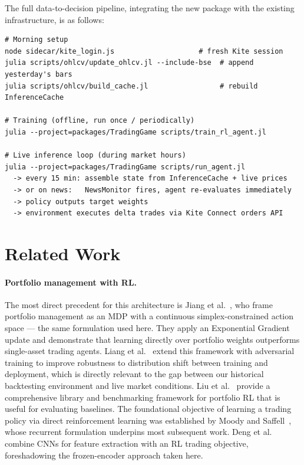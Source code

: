 \documentclass[11pt, a4paper]{article}
\begin{document}
The full data-to-decision pipeline, integrating the new package with the
existing infrastructure, is as follows:

\begin{lstlisting}
# Morning setup
node sidecar/kite_login.js                    # fresh Kite session
julia scripts/ohlcv/update_ohlcv.jl --include-bse  # append yesterday's bars
julia scripts/ohlcv/build_cache.jl                 # rebuild InferenceCache

# Training (offline, run once / periodically)
julia --project=packages/TradingGame scripts/train_rl_agent.jl

# Live inference loop (during market hours)
julia --project=packages/TradingGame scripts/run_agent.jl
  -> every 15 min: assemble state from InferenceCache + live prices
  -> or on news:   NewsMonitor fires, agent re-evaluates immediately
  -> policy outputs target weights
  -> environment executes delta trades via Kite Connect orders API
\end{lstlisting}

\section{Related Work}

\paragraph{Portfolio management with RL.}
The most direct precedent for this architecture is Jiang et al.\
\cite{jiang2017portfolio}, who frame portfolio management as an MDP with a
continuous simplex-constrained action space — the same formulation used here.
They apply an Exponential Gradient update and demonstrate that learning
directly over portfolio weights outperforms single-asset trading agents.
Liang et al.\ \cite{liang2018adversarial} extend this framework with
adversarial training to improve robustness to distribution shift between
training and deployment, which is directly relevant to the gap between our
historical backtesting environment and live market conditions. Liu et al.\
\cite{liu2021finrl} provide a comprehensive library and benchmarking
framework for portfolio RL that is useful for evaluating baselines.
The foundational objective of learning a trading policy via direct
reinforcement learning was established by Moody and Saffell~\cite{moody2001trading},
whose recurrent formulation underpins most subsequent work. Deng et
al.\ \cite{deng2017deep} combine CNNs for feature extraction with an RL
trading objective, foreshadowing the frozen-encoder approach taken here.
\end{document}
